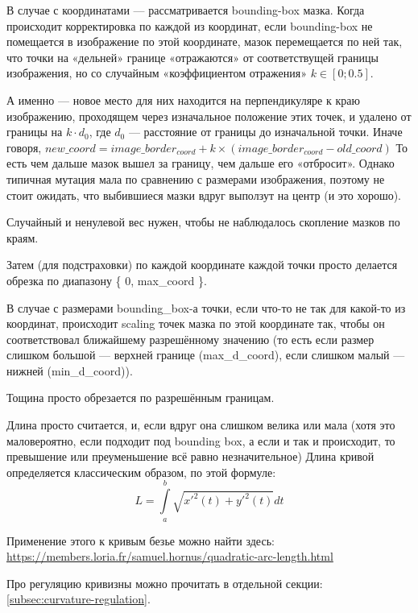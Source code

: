 В случае с координатами — рассматривается bounding-box мазка.
Когда происходит корректировка по каждой из координат, если bounding-box не помещается в изображение по этой координате,
мазок перемещается по ней так, что точки на «дельней» границе «отражаются» от соответствущей границы изображения, но
со случайным «коэффициентом отражения» $k \in [0; 0.5]$.

А именно — новое место для них находится на перпендикуляре к краю изображению,
проходящем через изначальное положение этих точек, и удалено от границы на $k \cdot d_0$, где $d_0$ — расстояние от границы до изначальной точки.
Иначе говоря, $new\_coord = image\_border_{coord} + k \times (image\_border_{coord} - old\_coord)$
То есть чем дальше мазок вышел за границу, чем дальше его «отбросит».
Однако типичная мутация мала по сравнению с размерами изображения, поэтому не стоит ожидать, что выбившиеся мазки вдруг выползут на центр (и это хорошо).

Случайный и ненулевой вес нужен, чтобы не наблюдалось скопление мазков по краям.

Затем (для подстраховки) по каждой координате каждой точки просто делается обрезка по диапазону \{ 0, max_coord \}.

В случае с размерами bounding\_box-а точки, если что-то не так для какой-то из координат, происходит scaling точек мазка по этой координате так,
чтобы он соответствовал ближайшему разрешённому значению
(то есть если размер слишком большой — верхней границе (max_{d_{coord}}), если слишком малый — нижней (min_{d_{coord}})).

Тощина просто обрезается по разрешённым границам.

Длина просто считается, и, если вдруг она слишком велика или мала
(хотя это маловероятно, если подходит под bounding box, а если и так и происходит, то превышение или преуменьшение всё равно незначительное)
Длина кривой определяется классическим образом, по этой формуле:
\begin{equation}\label{eq:curve_length}
    L = \int \limits_{a}^{b}{ \sqrt {{x'}^{2}(t) + {y'}^{2}(t)} } dt
\end{equation}

Применение этого к кривым безье можно найти здесь: \url{https://members.loria.fr/samuel.hornus/quadratic-arc-length.html}

Про регуляцию кривизны можно прочитать в отдельной секции: \ref{subsec:curvature-regulation}.


